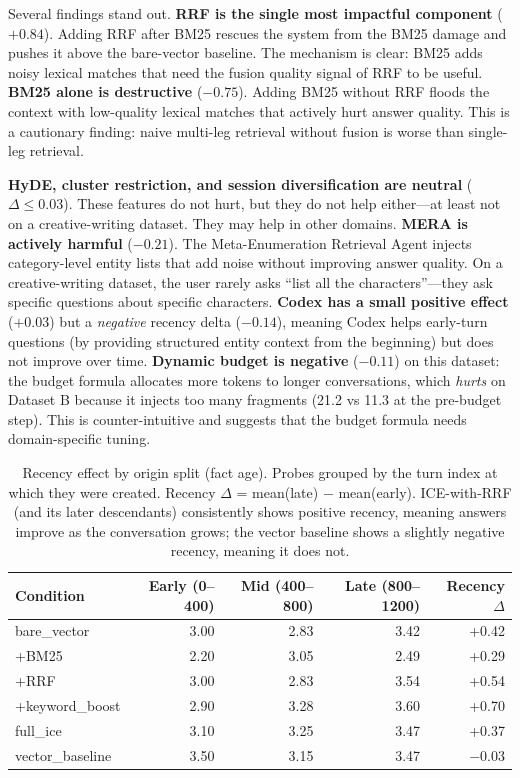 \documentclass[10pt]{article}
\begin{document}
Several findings stand out. \textbf{RRF is the single most impactful component} ($+0.84$). Adding RRF after BM25 rescues the system from the BM25 damage and pushes it above the bare-vector baseline. The mechanism is clear: BM25 adds noisy lexical matches that need the fusion quality signal of RRF to be useful. \textbf{BM25 alone is destructive} ($-0.75$). Adding BM25 without RRF floods the context with low-quality lexical matches that actively hurt answer quality. This is a cautionary finding: naive multi-leg retrieval without fusion is worse than single-leg retrieval.

\textbf{HyDE, cluster restriction, and session diversification are neutral} ($\Delta \leq 0.03$). These features do not hurt, but they do not help either---at least not on a creative-writing dataset. They may help in other domains. \textbf{MERA is actively harmful} ($-0.21$). The Meta-Enumeration Retrieval Agent injects category-level entity lists that add noise without improving answer quality. On a creative-writing dataset, the user rarely asks ``list all the characters''---they ask specific questions about specific characters. \textbf{Codex has a small positive effect} ($+0.03$) but a \emph{negative} recency delta ($-0.14$), meaning Codex helps early-turn questions (by providing structured entity context from the beginning) but does not improve over time. \textbf{Dynamic budget is negative} ($-0.11$) on this dataset: the budget formula allocates more tokens to longer conversations, which \emph{hurts} on Dataset B because it injects too many fragments (21.2 vs 11.3 at the pre-budget step). This is counter-intuitive and suggests that the budget formula needs domain-specific tuning.

\begin{table}[htbp]
\centering
\small
\caption{Recency effect by origin split (fact age). Probes grouped by the turn index at which they were created. Recency $\Delta$ = mean(late) $-$ mean(early). ICE-with-RRF (and its later descendants) consistently shows positive recency, meaning answers improve as the conversation grows; the vector baseline shows a slightly negative recency, meaning it does not.}
\label{tab:ablation-recency}
\begin{tabular}{lrrrr}
\toprule
\textbf{Condition} & \textbf{Early (0--400)} & \textbf{Mid (400--800)} & \textbf{Late (800--1200)} & \textbf{Recency $\Delta$} \\
\midrule
bare\_vector       & 3.00 & 2.83 & 3.42 & +0.42 \\
+BM25              & 2.20 & 3.05 & 2.49 & +0.29 \\
+RRF               & 3.00 & 2.83 & 3.54 & +0.54 \\
+keyword\_boost    & 2.90 & 3.28 & 3.60 & +0.70 \\
full\_ice          & 3.10 & 3.25 & 3.47 & +0.37 \\
vector\_baseline   & 3.50 & 3.15 & 3.47 & $-0.03$ \\
\bottomrule
\end{tabular}
\end{table}
\end{document}

